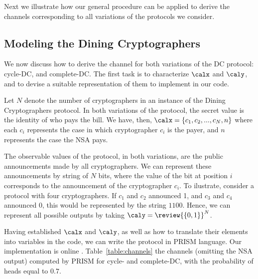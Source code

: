 Next we illustrate how our general procedure can be applied to derive the 
channels corresponding to all variations of the protocols we consider.

\subsection{Modeling the Dining Cryptographers}
We now discuss how to derive the channel for both variations of
the DC protocol: cycle-DC, and complete-DC. The first task is to
characterize $\calx$ and $\caly$, and to devise a suitable representation
of them to implement in our code.

Let $N$ denote the number of cryptographers in an instance of the
Dining Cryptographers protocol. 
In both variations of the protocol, the secret value is the identity 
of who pays the bill. 
We have, then, $\calx=\{c_1,c_2,...,c_N,n\}$ where
each $c_{i}$ represents the case in which cryptographer $c_{i}$ is
the payer, and $n$ represents  the case the NSA pays.

The observable values of the protocol, in both variations, are 
the public announcements made by all cryptographers. 
We can represent these announcements by  string of $N$ bits, 
where the value of the bit at position $i$ corresponds to the 
announcement of the cryptographer $c_i$. To ilustrate, consider
a protocol with four cryptographers. If $c_1$ and $c_2$ announced 1, 
and $c_3$ and $c_4$ announced 0, this would be represented by the 
string $1100$.
Hence, we can represent all possible outputs by taking $\caly=\review{\{0, 1\}}^{N}$.

Having established $\calx$ and $\caly$, as well as how to translate
their elements into variables in the code, we can write the protocol in PRISM
language. 
Our implementation is  online \cite{link}.
Table~\ref{table:channels}  the channels (omitting the NSA output)
computed by PRISM for cycle- and complete-DC, with the 
probability of heads equal to $0.7$.

